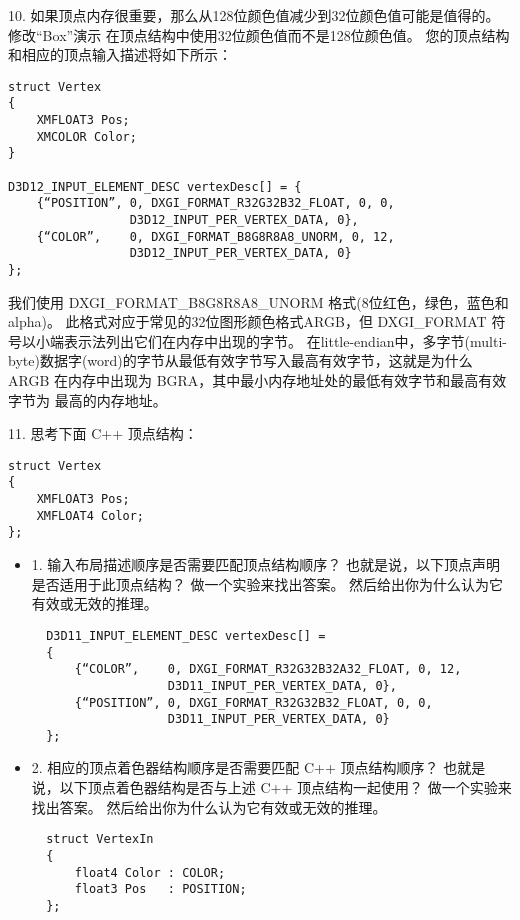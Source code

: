 \begin{flushleft}
10. 如果顶点内存很重要，那么从128位颜色值减少到32位颜色值可能是值得的。修改“Box”演示 在顶点结构中使用32位颜色值而不是128位颜色值。 您的顶点结构和相应的顶点输入描述将如下所示：\\
\end{flushleft}
\begin{lstlisting}
struct Vertex
{
    XMFLOAT3 Pos;
    XMCOLOR Color;
}

D3D12_INPUT_ELEMENT_DESC vertexDesc[] = {
    {“POSITION”, 0, DXGI_FORMAT_R32G32B32_FLOAT, 0, 0, 
                 D3D12_INPUT_PER_VERTEX_DATA, 0},
    {“COLOR”,    0, DXGI_FORMAT_B8G8R8A8_UNORM, 0, 12,
                 D3D12_INPUT_PER_VERTEX_DATA, 0}
};
\end{lstlisting}
\begin{flushleft}
我们使用 DXGI\_FORMAT\_B8G8R8A8\_UNORM 格式(8位红色，绿色，蓝色和alpha)。 此格式对应于常见的32位图形颜色格式ARGB，但 DXGI\_FORMAT 符号以小端表示法列出它们在内存中出现的字节。 在little-endian中，多字节(multi-byte)数据字(word)的字节从最低有效字节写入最高有效字节，这就是为什么 ARGB 在内存中出现为 BGRA，其中最小内存地址处的最低有效字节和最高有效字节为 最高的内存地址。
\end{flushleft}

\begin{flushleft}
11. 思考下面 C++ 顶点结构：
\end{flushleft}
\begin{lstlisting}
struct Vertex
{
    XMFLOAT3 Pos;
    XMFLOAT4 Color;
};
\end{lstlisting}
\begin{itemize}
  \item 1. 输入布局描述顺序是否需要匹配顶点结构顺序？ 也就是说，以下顶点声明是否适用于此顶点结构？ 做一个实验来找出答案。 然后给出你为什么认为它有效或无效的推理。
  \begin{lstlisting}
  D3D11_INPUT_ELEMENT_DESC vertexDesc[] =
  {
      {“COLOR”,    0, DXGI_FORMAT_R32G32B32A32_FLOAT, 0, 12,
                   D3D11_INPUT_PER_VERTEX_DATA, 0},
      {“POSITION”, 0, DXGI_FORMAT_R32G32B32_FLOAT, 0, 0,
                   D3D11_INPUT_PER_VERTEX_DATA, 0}
  };
  \end{lstlisting}
  \item 2. 相应的顶点着色器结构顺序是否需要匹配 C++ 顶点结构顺序？ 也就是说，以下顶点着色器结构是否与上述 C++ 顶点结构一起使用？ 做一个实验来找出答案。 然后给出你为什么认为它有效或无效的推理。
  \begin{lstlisting}
  struct VertexIn
  {
      float4 Color : COLOR;
      float3 Pos   : POSITION;
  };
  \end{lstlisting}
\end{itemize}

